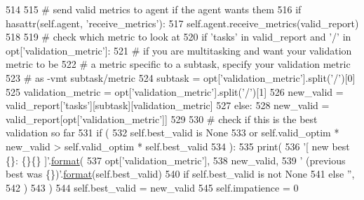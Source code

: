\begin{DoxyCode}
514 
515         \textcolor{comment}{# send valid metrics to agent if the agent wants them}
516         \textcolor{keywordflow}{if} hasattr(self.agent, \textcolor{stringliteral}{'receive\_metrics'}):
517             self.agent.receive\_metrics(valid\_report)
518 
519         \textcolor{comment}{# check which metric to look at}
520         \textcolor{keywordflow}{if} \textcolor{stringliteral}{'tasks'} \textcolor{keywordflow}{in} valid\_report \textcolor{keywordflow}{and} \textcolor{stringliteral}{'/'} \textcolor{keywordflow}{in} opt[\textcolor{stringliteral}{'validation\_metric'}]:
521             \textcolor{comment}{# if you are multitasking and want your validation metric to be}
522             \textcolor{comment}{# a metric specific to a subtask, specify your validation metric}
523             \textcolor{comment}{# as -vmt subtask/metric}
524             subtask = opt[\textcolor{stringliteral}{'validation\_metric'}].split(\textcolor{stringliteral}{'/'})[0]
525             validation\_metric = opt[\textcolor{stringliteral}{'validation\_metric'}].split(\textcolor{stringliteral}{'/'})[1]
526             new\_valid = valid\_report[\textcolor{stringliteral}{'tasks'}][subtask][validation\_metric]
527         \textcolor{keywordflow}{else}:
528             new\_valid = valid\_report[opt[\textcolor{stringliteral}{'validation\_metric'}]]
529 
530         \textcolor{comment}{# check if this is the best validation so far}
531         \textcolor{keywordflow}{if} (
532             self.best\_valid \textcolor{keywordflow}{is} \textcolor{keywordtype}{None}
533             \textcolor{keywordflow}{or} self.valid\_optim * new\_valid > self.valid\_optim * self.best\_valid
534         ):
535             print(
536                 \textcolor{stringliteral}{'[ new best \{\}: \{\}\{\} ]'}.\hyperlink{namespaceparlai_1_1chat__service_1_1services_1_1messenger_1_1shared__utils_a32e2e2022b824fbaf80c747160b52a76}{format}(
537                     opt[\textcolor{stringliteral}{'validation\_metric'}],
538                     new\_valid,
539                     \textcolor{stringliteral}{' (previous best was \{\})'}.\hyperlink{namespaceparlai_1_1chat__service_1_1services_1_1messenger_1_1shared__utils_a32e2e2022b824fbaf80c747160b52a76}{format}(self.best\_valid)
540                     \textcolor{keywordflow}{if} self.best\_valid \textcolor{keywordflow}{is} \textcolor{keywordflow}{not} \textcolor{keywordtype}{None}
541                     \textcolor{keywordflow}{else} \textcolor{stringliteral}{''},
542                 )
543             )
544             self.best\_valid = new\_valid
545             self.impatience = 0

\end{DoxyCode}
